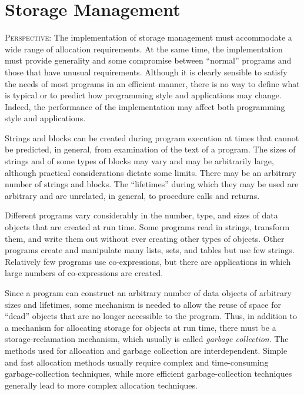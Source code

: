\chapter{Storage Management}

\textsc{Perspective}: The implementation of storage management must
accommodate a wide range of allocation requirements.  At the same
time, the implementation must provide generality and some compromise
between ``normal'' programs and those that have unusual
requirements. Although it is clearly sensible to satisfy the needs of
most programs in an efficient manner, there is no way to define what
is typical or to predict how programming style and applications may
change. Indeed, the performance of the implementation may affect both
programming style and applications.

Strings and blocks can be created during program execution at times
that cannot be predicted, in general, from examination of the text of
a program. The sizes of strings and of some types of blocks may vary
and may be arbitrarily large, although practical considerations
dictate some limits. There may be an arbitrary number of strings and
blocks.  The ``lifetimes'' during which they may be used are arbitrary
and are unrelated, in general, to procedure calls and returns.

Different programs vary considerably in the number, type, and sizes of
data objects that are created at run time. Some programs read in
strings, transform them, and write them out without ever creating
other types of objects. Other programs create and manipulate many
lists, sets, and tables but use few strings. Relatively few programs
use co-expressions, but there are applications in which large numbers
of co-expressions are created.

Since a program can construct an arbitrary number of data objects of
arbitrary sizes and lifetimes, some mechanism is needed to allow the
reuse of space for ``dead'' objects that are
no longer accessible to the program. Thus, in addition to a mechanism
for allocating storage for objects at run time, there must be a
storage-reclamation mechanism, which usually is called \textit{garbage
collection}. The methods used for allocation and garbage collection
are interdependent. Simple and fast allocation methods usually require
complex and time-consuming garbage-collection techniques, while more
efficient garbage-collection techniques generally lead to more complex
allocation techniques.

